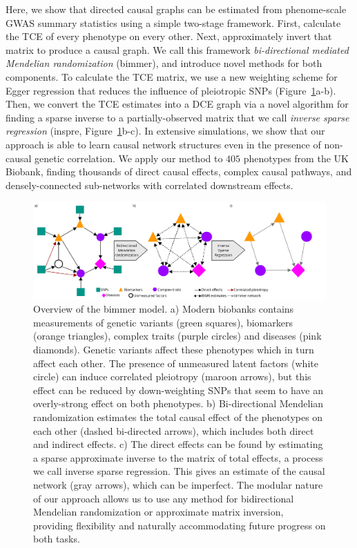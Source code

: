 \documentclass{article}
\begin{document}
Here, we show that directed causal graphs can be estimated from phenome-scale GWAS summary
statistics using a simple two-stage framework. First, calculate the TCE of every phenotype
on every other. Next, approximately invert that matrix to produce a causal graph.
We call this framework \emph{bi-directional mediated Mendelian randomization} (bimmer),
and introduce novel methods for both components. To calculate the TCE matrix, we
use a new weighting scheme for Egger regression that reduces the
influence of pleiotropic SNPs (Figure~\ref{figure0}a-b). Then, we convert the TCE
estimates into a DCE graph via a novel algorithm for finding a sparse inverse
to a partially-observed matrix that we call
\emph{inverse sparse regression} (inspre, Figure~\ref{figure0}b-c).
In extensive simulations, we show that our approach is able to learn causal
 network structures even in the presence of non-causal genetic correlation.
We apply our method to $405$ phenotypes from the UK Biobank, finding thousands
 of direct causal effects, complex causal pathways, and densely-connected sub-networks
 with correlated downstream effects. 
 
\begin{figure}
\includegraphics[width=\textwidth]{figures/bimmer_fig1.pdf}
\caption{Overview of the bimmer model. a) Modern biobanks contains measurements
of genetic variants (green squares), biomarkers
(orange triangles), complex traits (purple circles) and diseases (pink diamonds). Genetic variants
affect these phenotypes which in turn affect each other. The presence of unmeasured latent factors
(white circle)
can induce correlated pleiotropy (maroon arrows), but this effect can be reduced by down-weighting
SNPs that seem to have an overly-strong effect on both phenotypes. b) Bi-directional Mendelian randomization
estimates the total causal effect of the phenotypes on each other (dashed bi-directed arrows),
which includes both direct and indirect effects. c) The direct effects can be
found by estimating a sparse approximate inverse to the matrix of total effects, a process we
call inverse sparse regression. This gives an estimate of the causal network (gray arrows), which
can be imperfect. The modular nature of our approach allows us to use any method for bidirectional
Mendelian randomization or approximate matrix inversion, providing flexibility
and naturally accommodating future progress on both tasks.}
\label{figure0}
\end{figure}
\end{document}
